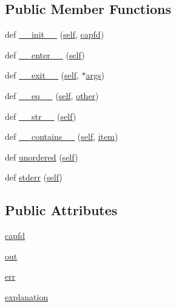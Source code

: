 \subsection*{Public Member Functions}
\begin{DoxyCompactItemize}
\item 
def \mbox{\hyperlink{classconftest_1_1_capture_a2ee20f9f9e2462f792de26352067b7d5}{\+\_\+\+\_\+init\+\_\+\+\_\+}} (\mbox{\hyperlink{modsupport_8h_a0180ca1808366e5da641475e8bf8cca3}{self}}, \mbox{\hyperlink{classconftest_1_1_capture_ab5d967cec6f385df69825703276d51f5}{capfd}})
\item 
def \mbox{\hyperlink{classconftest_1_1_capture_a58d7c254c26df5d9c35c158f035a5011}{\+\_\+\+\_\+enter\+\_\+\+\_\+}} (\mbox{\hyperlink{modsupport_8h_a0180ca1808366e5da641475e8bf8cca3}{self}})
\item 
def \mbox{\hyperlink{classconftest_1_1_capture_ab2f421f21b8cbfbf330548c1c97d6d71}{\+\_\+\+\_\+exit\+\_\+\+\_\+}} (\mbox{\hyperlink{modsupport_8h_a0180ca1808366e5da641475e8bf8cca3}{self}}, $\ast$\mbox{\hyperlink{classargs}{args}})
\item 
def \mbox{\hyperlink{classconftest_1_1_capture_ade6db8e0c1632191d9590e977e088117}{\+\_\+\+\_\+eq\+\_\+\+\_\+}} (\mbox{\hyperlink{modsupport_8h_a0180ca1808366e5da641475e8bf8cca3}{self}}, \mbox{\hyperlink{dictobject_8h_abd4733e17e86acb453bda62bc8b96adf}{other}})
\item 
def \mbox{\hyperlink{classconftest_1_1_capture_adb548312469db42e343100c63031604b}{\+\_\+\+\_\+str\+\_\+\+\_\+}} (\mbox{\hyperlink{modsupport_8h_a0180ca1808366e5da641475e8bf8cca3}{self}})
\item 
def \mbox{\hyperlink{classconftest_1_1_capture_aa5572436477a9578488b435930c04113}{\+\_\+\+\_\+contains\+\_\+\+\_\+}} (\mbox{\hyperlink{modsupport_8h_a0180ca1808366e5da641475e8bf8cca3}{self}}, \mbox{\hyperlink{dictobject_8h_a54447cc31a87ae88effdc512eb6d5496}{item}})
\item 
def \mbox{\hyperlink{classconftest_1_1_capture_a11fcfcc3f1dc2bf5bd01fb63a0671f3c}{unordered}} (\mbox{\hyperlink{modsupport_8h_a0180ca1808366e5da641475e8bf8cca3}{self}})
\item 
def \mbox{\hyperlink{classconftest_1_1_capture_a19a155365feee6e35ec4c5451b76343c}{stderr}} (\mbox{\hyperlink{modsupport_8h_a0180ca1808366e5da641475e8bf8cca3}{self}})
\end{DoxyCompactItemize}
\subsection*{Public Attributes}
\begin{DoxyCompactItemize}
\item 
\mbox{\hyperlink{classconftest_1_1_capture_ab5d967cec6f385df69825703276d51f5}{capfd}}
\item 
\mbox{\hyperlink{classconftest_1_1_capture_a838f303022f5a56d27db37ab694db39b}{out}}
\item 
\mbox{\hyperlink{classconftest_1_1_capture_ac349bd0bcaab537f094dd475fb43331f}{err}}
\item 
\mbox{\hyperlink{classconftest_1_1_capture_af23c296d760c928ba72bf2f46a29e2cc}{explanation}}
\end{DoxyCompactItemize}
